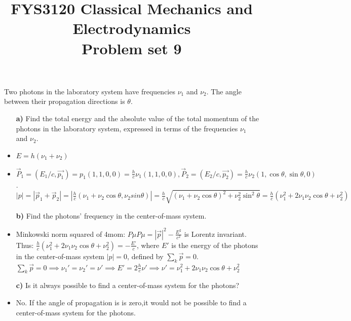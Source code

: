 \documentclass[11pt,a4paper]{report}
\title{FYS3120 Classical Mechanics and Electrodynamics\\ 
\vspace{15mm}Problem set 9}
\newcounter{excount}[chapter]
\newenvironment{exercise}[1][]{\addtocounter{excount}{1} \noindent {\bf Problem
    \arabic{excount} \ \ #1}\hspace{2mm}}{\vspace{4mm}}
\begin{document}
\maketitle


\begin{exercise}
Two photons in the laboratory system have frequencies $\nu_1$ and $\nu_2$. The angle between their propagation directions is $\theta$.
\begin{itemize}
\item[\bf a)] Find the total energy and the absolute value of the total momentum of the photons in the laboratory system, expressed in terms of the frequencies $\nu_1$ and $\nu_2$.
\item $E=h(\nu_1+\nu_2)$
\item $\vec{P}_1=(E_1/c,\vec{p_1})=p_1(1,1,0,0)=\frac{h}{c}\nu_1(1,1,0,0), \vec{P}_2=(E_2/c,\vec{p_2})=\frac{h}{c}\nu_2(1,\cos \theta,\sin \theta,0)$. $|p|=|\vec{p}_1+\vec{p}_2|=|\frac{h}{c} (\nu_1+\nu_2 \cos \theta,\nu_2 sin \theta)|=\frac{h}{c}\sqrt{(\nu_1+\nu_2\cos \theta)^2+\nu_2^2\sin^2 \theta}=\frac{h}{c}(\nu_1^2+2\nu_1\nu_2 \cos \theta + \nu_2^2)$
\item[\bf b)] Find the photons' frequency in the center-of-mass system.
\item Minkowski norm squared of 4mom: $P\mu P\mu=|\vec{p}|^2-\frac{E^2}{c^2}$ is Lorentz invariant. Thus: $\frac{h}{c}(\nu_1^2+2\nu_1\nu_2 \cos \theta + \nu_2^2)=-\frac{E'}{c}$, where $E'$ is the energy of the photons in the center-of-mass system $|p|=0$, defined by $\sum_k \vec{p}=0$. $\sum_k \vec{p}=0 \implies \nu_1'=\nu_2'=\nu' \implies E'=2\frac{h}{c}\nu' \implies \nu'=\nu_1^2+2\nu_1\nu_2 \cos \theta + \nu_2^2$
\item[\bf c)] Is it always possible to find a center-of-mass system for the photons?
\item No. If the angle of propagation is is zero,it would not be possible to find a center-of-mass system for the photons. 
\end{itemize}
\end{exercise}
\end{document}
